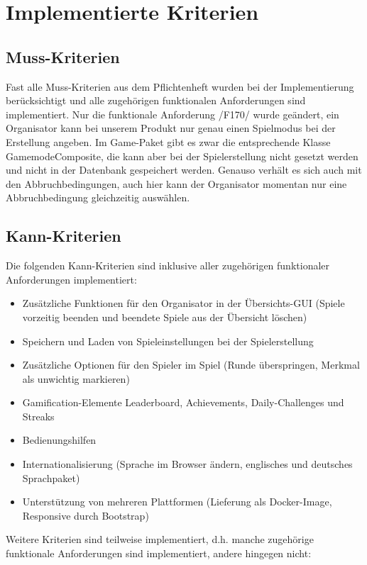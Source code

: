 \documentclass[a4paper]{scrreprt}
\begin{document}
\chapter{Implementierte Kriterien}

\section{Muss-Kriterien}
Fast alle Muss-Kriterien aus dem Pflichtenheft wurden bei der Implementierung berücksichtigt und alle zugehörigen funktionalen Anforderungen sind implementiert. Nur die funktionale Anforderung /F170/ wurde geändert, ein Organisator kann bei unserem Produkt nur genau einen Spielmodus bei der Erstellung angeben. Im Game-Paket gibt es zwar die entsprechende Klasse GamemodeComposite, die kann aber bei der Spielerstellung nicht gesetzt werden und nicht in der Datenbank gespeichert werden. Genauso verhält es sich auch mit den Abbruchbedingungen, auch hier kann der Organisator momentan nur eine Abbruchbedingung gleichzeitig auswählen.


\section{Kann-Kriterien}
Die folgenden Kann-Kriterien sind inklusive aller zugehörigen funktionaler Anforderungen implementiert:

\begin{itemize}
\item Zusätzliche Funktionen für den Organisator in der Übersichts-GUI (Spiele vorzeitig beenden und beendete Spiele aus der Übersicht löschen)
\item Speichern und Laden von Spieleinstellungen bei der Spielerstellung
\item Zusätzliche Optionen für den Spieler im Spiel (Runde überspringen, Merkmal als unwichtig markieren)
\item Gamification-Elemente Leaderboard, Achievements, Daily-Challenges und Streaks
\item Bedienungshilfen
\item Internationalisierung (Sprache im Browser ändern, englisches und deutsches Sprachpaket)
\item Unterstützung von mehreren Plattformen (Lieferung als Docker-Image, Responsive durch Bootstrap)
\end{itemize}

\hspace{1cm}

Weitere Kriterien sind teilweise implementiert, d.h. manche zugehörige funktionale Anforderungen sind implementiert, andere hingegen nicht:
\end{document}
